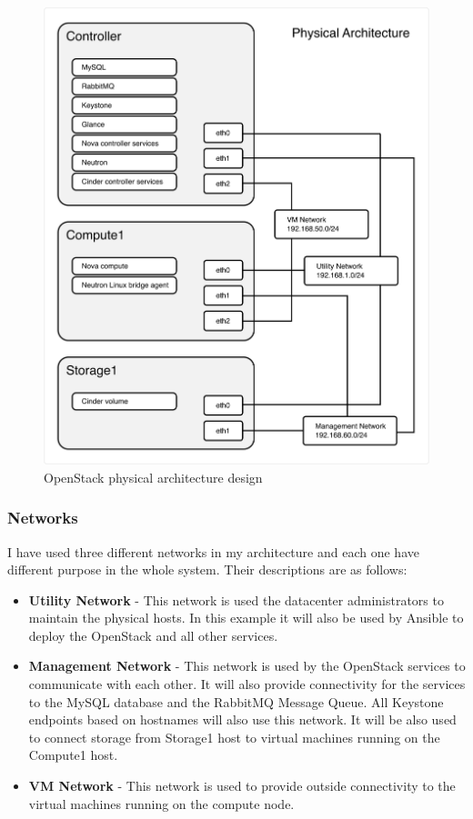 \begin{figure}[!h]
  \includegraphics[width=\textwidth]{fig/my_architecture.png}
  \caption{OpenStack physical architecture design}
  \label{fig:openstack_physical_arch}
\end{figure}

\subsubsection*{Networks}
I have used three different networks in my architecture and each one have different purpose in the whole system. Their descriptions are as follows:
\begin{itemize}
  \item{\textbf{Utility Network} - This network is used the datacenter administrators to maintain the physical hosts. In this example it will also be used by Ansible to deploy the OpenStack and all other services.}
  \item{\textbf{Management Network} - This network is used by the OpenStack services to communicate with each other. It will also provide connectivity for the services to the MySQL database and the RabbitMQ Message Queue. All Keystone endpoints based on hostnames will also use this network. It will be also used to connect storage from Storage1 host to virtual machines running on the Compute1 host.}
  \item{\textbf{VM Network} - This network is used to provide outside connectivity to the virtual machines running on the compute node.}
\end{itemize}

